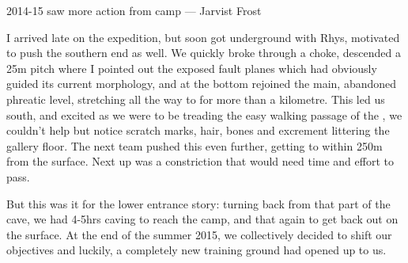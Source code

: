 \begin{marginfigure}
	\checkoddpage \ifoddpage \forcerectofloat \else \forceversofloat \fi
	\centering	{} 
  	\caption{2014-15 saw more action from camp \protect{}--- Jarvist Frost}
	\end{marginfigure}

I arrived late on the expedition, but soon got underground with Rhys, motivated to push the southern end as well. We quickly broke through a choke, descended a 25m pitch where I pointed out the exposed fault planes which had obviously guided its current morphology, and at the bottom rejoined the main, abandoned phreatic level, stretching all the way to  for more than a kilometre. This led us south, and excited as we were to be treading the easy walking passage of the , we couldn’t help but notice scratch marks, hair, bones and excrement littering the gallery floor. The next team pushed this even further, getting to within 250m from the surface. Next up was a constriction that would need time and effort to pass.

But this was it for the lower entrance story: turning back from that part of the cave, we had 4-5hrs caving to reach the camp, and that again to get back out on the surface. At the end of the summer 2015, we collectively decided to shift our objectives and luckily, a completely new training ground had opened up to us.

